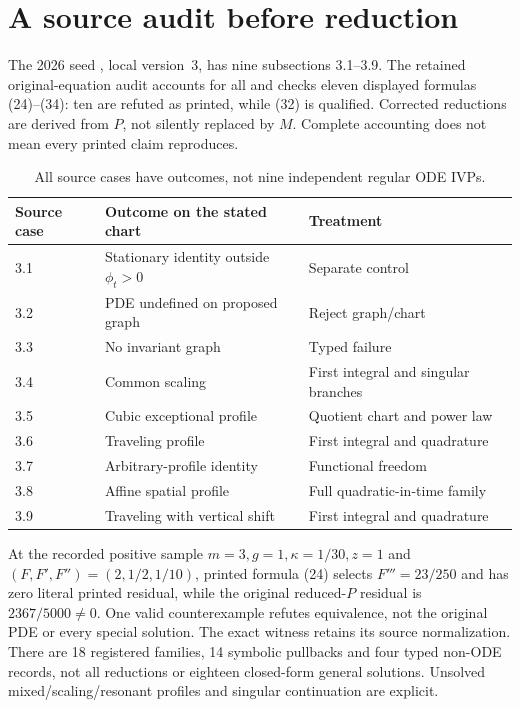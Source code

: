 \documentclass[11pt,a4paper,oneside]{report}
\numberwithin{equation}{chapter}
\begin{document}
\section{A source audit before reduction}
The 2026 seed \cite{ap}, local version~3, has nine subsections 3.1--3.9.
The retained original-equation audit accounts for all and checks eleven
displayed formulas (24)--(34): ten are refuted as printed, while (32) is
qualified. Corrected reductions are derived from $P$, not silently replaced
by $M$. Complete accounting does not mean every printed claim reproduces.
\begin{table}[htbp]\centering\small
\begin{tabularx}{\textwidth}{@{}lXX@{}}\toprule
Source case & Outcome on the stated chart & Treatment\\\midrule
3.1 & Stationary identity outside $\phi_t>0$ & Separate control\\
3.2 & PDE undefined on proposed graph & Reject graph/chart\\
3.3 & No invariant graph & Typed failure\\
3.4 & Common scaling & First integral and singular branches\\
3.5 & Cubic exceptional profile & Quotient chart and power law\\
3.6 & Traveling profile & First integral and quadrature\\
3.7 & Arbitrary-profile identity & Functional freedom\\
3.8 & Affine spatial profile & Full quadratic-in-time family\\
3.9 & Traveling with vertical shift & First integral and quadrature\\\bottomrule
\end{tabularx}
\caption{All source cases have outcomes, not nine independent regular ODE IVPs.}
\label{tab:source-audit}
\end{table}

At the recorded positive sample $m=3,g=1,\kappa=1/30,z=1$ and
$(F,F',F'')=(2,1/2,1/10)$, printed formula (24) selects
$F'''=23/250$ and has zero literal printed residual, while the original
reduced-$P$ residual is $2367/5000\ne0$.
One valid counterexample refutes equivalence, not the original PDE or every
special solution. The exact witness retains its source normalization.
There are 18 registered families, 14 symbolic pullbacks and four typed
non-ODE records, not all reductions or eighteen closed-form general solutions.
Unsolved mixed/scaling/resonant profiles and singular continuation are explicit.
\end{document}
